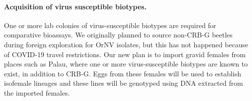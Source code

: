 \documentclass[12pt,letterpaper,english,bibliography=totocnumbered,abstract=on]{scrartcl}
\begin{document}
\paragraph{Acquisition of virus susceptible biotypes.} One or more lab colonies of virus-susceptible biotypes are required for comparative bioassays. We
originally planned to source non-CRB-G beetles during foreign exploration for OrNV
isolates, but this has not happened because of COVID-19 travel restrictions.
Our new plan is to import gravid females from places such as Palau, where one or more
virus-susceptible biotypes are known to exist, in addition to CRB-G. Eggs from these
females will be used to establish isofemale lineages and these lines will be genotyped
using DNA extracted from the imported females.

\clearpage
\printbibliography[heading=bibintoc]
\end{document}
